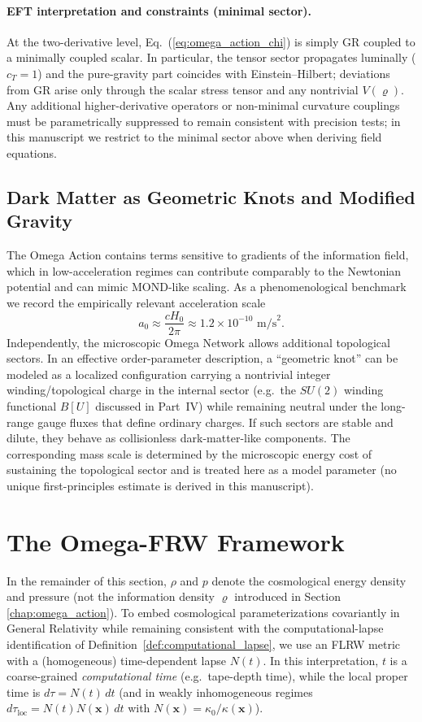 \paragraph{EFT interpretation and constraints (minimal sector).}
At the two-derivative level, Eq.~(\ref{eq:omega_action_chi}) is simply GR coupled to a minimally coupled scalar. In particular, the tensor sector propagates luminally ($c_T=1$) and the pure-gravity part coincides with Einstein--Hilbert; deviations from GR arise only through the scalar stress tensor and any nontrivial $V(\varrho)$. Any additional higher-derivative operators or non-minimal curvature couplings must be parametrically suppressed to remain consistent with precision tests; in this manuscript we restrict to the minimal sector above when deriving field equations.

\subsection{Dark Matter as Geometric Knots and Modified Gravity}
The Omega Action contains terms sensitive to gradients of the information field, which in low-acceleration regimes can contribute comparably to the Newtonian potential and can mimic MOND-like scaling. As a phenomenological benchmark we record the empirically relevant acceleration scale \cite{Milgrom1983MOND}
\begin{equation}
    a_0 \approx \frac{c H_0}{2\pi} \approx 1.2 \times 10^{-10} \text{ m/s}^2.
\end{equation}
Independently, the microscopic Omega Network allows additional topological sectors. In an effective order-parameter description, a ``geometric knot'' can be modeled as a localized configuration carrying a nontrivial integer winding/topological charge in the internal sector (e.g.\ the $SU(2)$ winding functional $B[U]$ discussed in Part~IV) while remaining neutral under the long-range gauge fluxes that define ordinary charges. If such sectors are stable and dilute, they behave as collisionless dark-matter-like components. The corresponding mass scale is determined by the microscopic energy cost of sustaining the topological sector and is treated here as a model parameter (no unique first-principles estimate is derived in this manuscript).


\section{The Omega-FRW Framework}
\label{chap:cosmology}
In the remainder of this section, $\rho$ and $p$ denote the cosmological energy density and pressure (not the information density $\varrho$ introduced in Section \ref{chap:omega_action}).
To embed cosmological parameterizations covariantly in General Relativity while remaining consistent with the computational-lapse identification of Definition~\ref{def:computational_lapse}, we use an FLRW metric with a (homogeneous) time-dependent lapse $N(t)$. In this interpretation, $t$ is a coarse-grained \emph{computational time} (e.g.\ tape-depth time), while the local proper time is $d\tau = N(t)\,dt$ (and in weakly inhomogeneous regimes $d\tau_{\mathrm{loc}}=N(t)N(\mathbf{x})\,dt$ with $N(\mathbf{x})=\kappa_0/\kappa(\mathbf{x})$).

